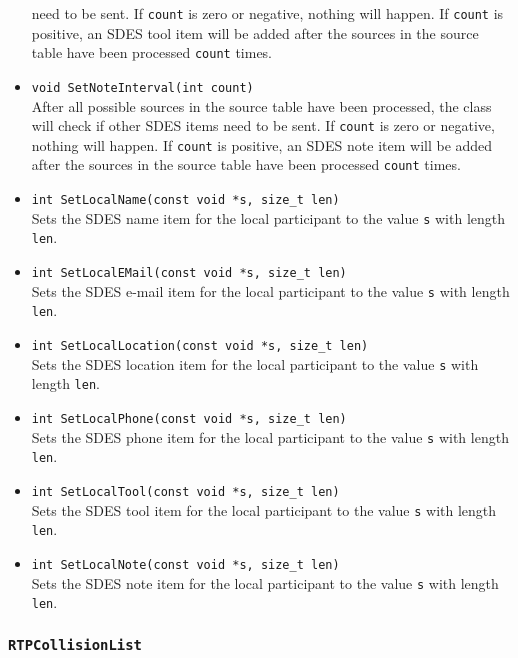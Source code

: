 \documentclass[12pt,a4paper]{article}
\newcommand{\headerfile}[1]{\marginpar{\scriptsize Header:\\{\tt #1}}}
\begin{document}
\begin{itemize}
						need to be sent. If {\tt count} is zero or negative, nothing
						will happen. If {\tt count} is positive, an SDES tool
						item will be added after the sources in the source table have
						been processed {\tt count} times.
					\item {\tt void SetNoteInterval(int count)}\\
						After all possible sources in the source table have been
						processed, the class will check if other SDES items
						need to be sent. If {\tt count} is zero or negative, nothing
						will happen. If {\tt count} is positive, an SDES note
						item will be added after the sources in the source table have
						been processed {\tt count} times.
					\item {\tt int SetLocalName(const void *s, size\_t len)}\\
						Sets the SDES name item for the local participant to the value {\tt s}
						with length {\tt len}.
					\item {\tt int SetLocalEMail(const void *s, size\_t len)}\\
						Sets the SDES e-mail item for the local participant to the value {\tt s}
						with length {\tt len}.
					\item {\tt int SetLocalLocation(const void *s, size\_t len)}\\
						Sets the SDES location item for the local participant to the value {\tt s}
						with length {\tt len}.
					\item {\tt int SetLocalPhone(const void *s, size\_t len)}\\
						Sets the SDES phone item for the local participant to the value {\tt s}
						with length {\tt len}.
					\item {\tt int SetLocalTool(const void *s, size\_t len)}\\
						Sets the SDES tool item for the local participant to the value {\tt s}
						with length {\tt len}.
					\item {\tt int SetLocalNote(const void *s, size\_t len)}\\
						Sets the SDES note item for the local participant to the value {\tt s}
						with length {\tt len}.
				\end{itemize}
				
			\subsubsection{\tt RTPCollisionList}\headerfile{rtpcollisionlist.h}
		
\end{document}
